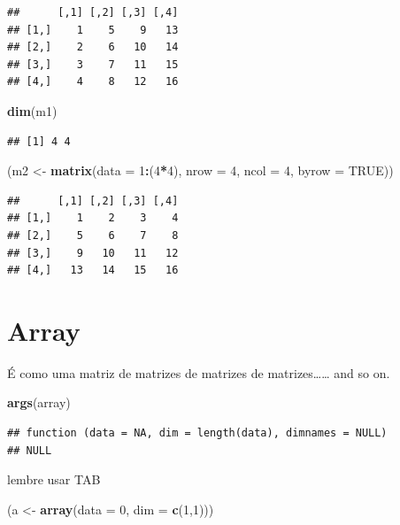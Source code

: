 \documentclass[]{book}
\newenvironment{Shaded}{\begin{snugshade}}{\end{snugshade}}
\newcommand{\KeywordTok}[1]{\textcolor[rgb]{0.13,0.29,0.53}{\textbf{#1}}}
\newcommand{\DataTypeTok}[1]{\textcolor[rgb]{0.13,0.29,0.53}{#1}}
\newcommand{\DecValTok}[1]{\textcolor[rgb]{0.00,0.00,0.81}{#1}}
\newcommand{\StringTok}[1]{\textcolor[rgb]{0.31,0.60,0.02}{#1}}
\newcommand{\OtherTok}[1]{\textcolor[rgb]{0.56,0.35,0.01}{#1}}
\newcommand{\OperatorTok}[1]{\textcolor[rgb]{0.81,0.36,0.00}{\textbf{#1}}}
\newcommand{\NormalTok}[1]{#1}
\begin{document}
\begin{verbatim}
##      [,1] [,2] [,3] [,4]
## [1,]    1    5    9   13
## [2,]    2    6   10   14
## [3,]    3    7   11   15
## [4,]    4    8   12   16
\end{verbatim}

\begin{Shaded}
\begin{Highlighting}[]
\KeywordTok{dim}\NormalTok{(m1)}
\end{Highlighting}
\end{Shaded}

\begin{verbatim}
## [1] 4 4
\end{verbatim}

\begin{Shaded}
\begin{Highlighting}[]
\NormalTok{(m2 <-}\StringTok{ }\KeywordTok{matrix}\NormalTok{(}\DataTypeTok{data =} \DecValTok{1}\OperatorTok{:}\NormalTok{(}\DecValTok{4}\OperatorTok{*}\DecValTok{4}\NormalTok{), }\DataTypeTok{nrow =} \DecValTok{4}\NormalTok{, }\DataTypeTok{ncol =} \DecValTok{4}\NormalTok{, }\DataTypeTok{byrow =} \OtherTok{TRUE}\NormalTok{))}
\end{Highlighting}
\end{Shaded}

\begin{verbatim}
##      [,1] [,2] [,3] [,4]
## [1,]    1    2    3    4
## [2,]    5    6    7    8
## [3,]    9   10   11   12
## [4,]   13   14   15   16
\end{verbatim}

\section{Array}\label{array}

É como uma matriz de matrizes de matrizes de matrizes\ldots{}\ldots{}
and so on.

\begin{Shaded}
\begin{Highlighting}[]
\KeywordTok{args}\NormalTok{(array)}
\end{Highlighting}
\end{Shaded}

\begin{verbatim}
## function (data = NA, dim = length(data), dimnames = NULL) 
## NULL
\end{verbatim}

lembre usar TAB

\begin{Shaded}
\begin{Highlighting}[]
\NormalTok{(a <-}\StringTok{ }\KeywordTok{array}\NormalTok{(}\DataTypeTok{data =} \DecValTok{0}\NormalTok{, }\DataTypeTok{dim =} \KeywordTok{c}\NormalTok{(}\DecValTok{1}\NormalTok{,}\DecValTok{1}\NormalTok{)))}
\end{Highlighting}
\end{Shaded}
\end{document}
